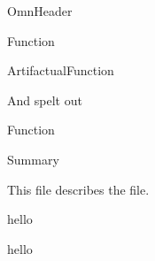 \documentclass{article}
\begin{document}
OmnHeader
\OmnEntityHeaderheader

Function

\OmnEntityClassFunction

ArtifactualFunction

\OmnEntityClassArtifactualFunction


And spelt out

Function




Summary

\omnsummary

This file describes the \omndocfile{} file. 


\expandafter\def\csname Obi123\endcsname{hello}
\csname Obi123\endcsname

\expandafter\def\csname has_function\endcsname{hello}
\csname has_function\endcsname
\end{document}
